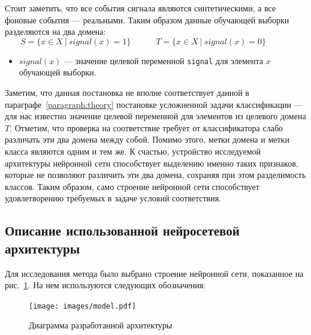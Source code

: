 \documentclass[14pt, a4paper]{extarticle}
\begin{document}
Стоит заметить, что все события сигнала являются синтетическими, а все фоновые события — реальными. Таким образом данные обучающей выборки разделяются на два домена:
\begin{equation*}
	S = \{ x \in X~|~signal(x) = 1 \} \quad \quad \quad
	T = \{ x \in X~|~signal(x) = 0 \} \quad \quad \quad
\end{equation*}
\begin{itemize}
	\item $signal(x)$ — значение целевой переменной \texttt{signal} для элемента $x$ обучающей выборки.
\end{itemize}

Заметим, что данная постановка не вполне соответствует данной в параграфе~\ref{paragraph:theory} постановке усложненной задачи классификации — для нас известно значение целевой переменной для элементов из целевого домена $T$. Отметим, что проверка на соответствие требует от классификатора слабо различать эти два домена между собой. Помимо этого, метки домена и метки класса являются одним и тем же. К счастью, устройство исследуемой архитектуры нейронной сети способствует выделению именно таких признаков, которые не позволяют различить эти два домена, сохраняя при этом разделимость классов. Таким образом, само строение нейронной сети способствует удовлетворению требуемых в задаче условий соответствия.

\subsection*{Описание использованной нейросетевой архитектуры}

Для исследования метода было выбрано строение нейронной сети, показанное на рис.~\ref{fig:neural_net}. На нем используются следующих обозначения:

\begin{figure}
	\centering
	\texttt{[image: images/model.pdf]}
	\caption{Диаграмма разработанной архитектуры}
	\label{fig:neural_net}
\end{figure}
\end{document}
